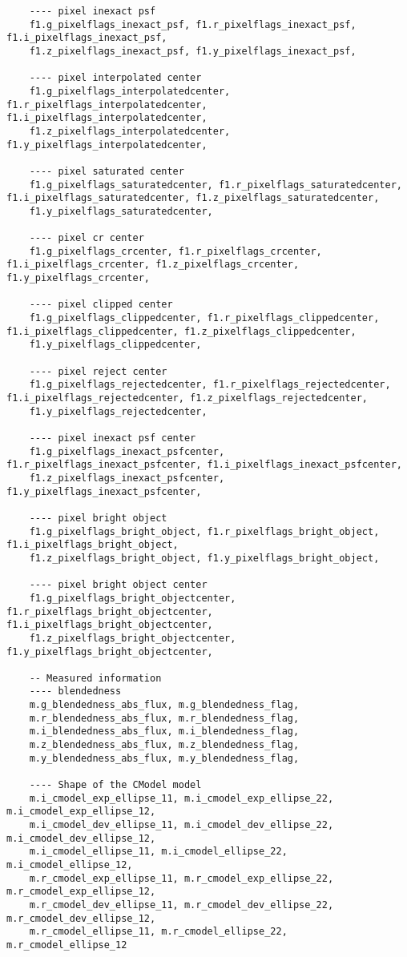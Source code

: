 \documentclass[fleqn,usenatbib,useAMS]{mnras}
\begin{document}
\begin{lstlisting}
    ---- pixel inexact psf
    f1.g_pixelflags_inexact_psf, f1.r_pixelflags_inexact_psf, f1.i_pixelflags_inexact_psf,
    f1.z_pixelflags_inexact_psf, f1.y_pixelflags_inexact_psf,
    
    ---- pixel interpolated center
    f1.g_pixelflags_interpolatedcenter, f1.r_pixelflags_interpolatedcenter, f1.i_pixelflags_interpolatedcenter,
    f1.z_pixelflags_interpolatedcenter, f1.y_pixelflags_interpolatedcenter,

    ---- pixel saturated center
    f1.g_pixelflags_saturatedcenter, f1.r_pixelflags_saturatedcenter, f1.i_pixelflags_saturatedcenter, f1.z_pixelflags_saturatedcenter,
    f1.y_pixelflags_saturatedcenter,

    ---- pixel cr center
    f1.g_pixelflags_crcenter, f1.r_pixelflags_crcenter, f1.i_pixelflags_crcenter, f1.z_pixelflags_crcenter, f1.y_pixelflags_crcenter,

    ---- pixel clipped center
    f1.g_pixelflags_clippedcenter, f1.r_pixelflags_clippedcenter, f1.i_pixelflags_clippedcenter, f1.z_pixelflags_clippedcenter,
    f1.y_pixelflags_clippedcenter,

    ---- pixel reject center
    f1.g_pixelflags_rejectedcenter, f1.r_pixelflags_rejectedcenter, f1.i_pixelflags_rejectedcenter, f1.z_pixelflags_rejectedcenter,
    f1.y_pixelflags_rejectedcenter,

    ---- pixel inexact psf center
    f1.g_pixelflags_inexact_psfcenter, f1.r_pixelflags_inexact_psfcenter, f1.i_pixelflags_inexact_psfcenter,
    f1.z_pixelflags_inexact_psfcenter, f1.y_pixelflags_inexact_psfcenter,

    ---- pixel bright object
    f1.g_pixelflags_bright_object, f1.r_pixelflags_bright_object, f1.i_pixelflags_bright_object,
    f1.z_pixelflags_bright_object, f1.y_pixelflags_bright_object,

    ---- pixel bright object center
    f1.g_pixelflags_bright_objectcenter, f1.r_pixelflags_bright_objectcenter, f1.i_pixelflags_bright_objectcenter,
    f1.z_pixelflags_bright_objectcenter, f1.y_pixelflags_bright_objectcenter,

	-- Measured information
	---- blendedness
	m.g_blendedness_abs_flux, m.g_blendedness_flag,
	m.r_blendedness_abs_flux, m.r_blendedness_flag,
	m.i_blendedness_abs_flux, m.i_blendedness_flag, 
	m.z_blendedness_abs_flux, m.z_blendedness_flag, 
	m.y_blendedness_abs_flux, m.y_blendedness_flag, 
	
	---- Shape of the CModel model
	m.i_cmodel_exp_ellipse_11, m.i_cmodel_exp_ellipse_22, m.i_cmodel_exp_ellipse_12,
	m.i_cmodel_dev_ellipse_11, m.i_cmodel_dev_ellipse_22, m.i_cmodel_dev_ellipse_12,
	m.i_cmodel_ellipse_11, m.i_cmodel_ellipse_22, m.i_cmodel_ellipse_12,
	m.r_cmodel_exp_ellipse_11, m.r_cmodel_exp_ellipse_22, m.r_cmodel_exp_ellipse_12,
	m.r_cmodel_dev_ellipse_11, m.r_cmodel_dev_ellipse_22, m.r_cmodel_dev_ellipse_12,
	m.r_cmodel_ellipse_11, m.r_cmodel_ellipse_22, m.r_cmodel_ellipse_12


\end{lstlisting}
\end{document}
